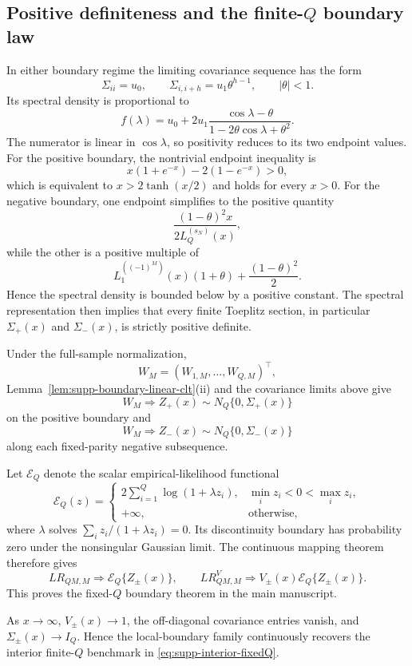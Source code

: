 \documentclass[12pt]{article}
\theoremstyle{remark}
\begin{document}
\subsection{Positive definiteness and the finite-$Q$ boundary law}
In either boundary regime the limiting covariance sequence has the form
\[
\Sigma_{ii}=u_0,
\qquad
\Sigma_{i,i+h}=u_1\theta^{h-1},
\qquad |\theta|<1.
\]
Its spectral density is proportional to
\[
f(\lambda)=u_0+2u_1\frac{\cos\lambda-\theta}{1-2\theta\cos\lambda+\theta^2}.
\]
The numerator is linear in $\cos\lambda$, so positivity reduces to its two endpoint values. For the positive boundary, the nontrivial endpoint inequality is
\[
x(1+e^{-x})-2(1-e^{-x})>0,
\]
which is equivalent to $x>2\tanh(x/2)$ and holds for every $x>0$. For the negative boundary, one endpoint simplifies to the positive quantity
\[
\frac{(1-\theta)^2x}{2L_Q^{(s_N)}(x)},
\]
while the other is a positive multiple of
\[
L_1^{((-1)^M)}(x)(1+\theta)+\frac{(1-\theta)^2}{2}.
\]
Hence the spectral density is bounded below by a positive constant. The spectral representation then implies that every finite Toeplitz section, in particular $\Sigma_+(x)$ and $\Sigma_-(x)$, is strictly positive definite.

Under the full-sample normalization,
\[
W_M=(W_{1,M},\ldots,W_{Q,M})^\top,
\]
Lemma~\ref{lem:supp-boundary-linear-clt}(ii) and the covariance limits above give
\[
W_M\Rightarrow Z_+(x)\sim N_Q\{0,\Sigma_+(x)\}
\]
on the positive boundary and
\[
W_M\Rightarrow Z_-(x)\sim N_Q\{0,\Sigma_-(x)\}
\]
along each fixed-parity negative subsequence.

Let $\mathcal E_Q$ denote the scalar empirical-likelihood functional
\[
\mathcal E_Q(z)=
\begin{cases}
2\sum_{i=1}^Q\log(1+\lambda z_i),&\min_i z_i<0<\max_i z_i,\\
+\infty,&\text{otherwise},
\end{cases}
\]
where $\lambda$ solves $\sum_i z_i/(1+\lambda z_i)=0$. Its discontinuity boundary has probability zero under the nonsingular Gaussian limit. The continuous mapping theorem therefore gives
\begin{equation}
LR_{QM,M}\Rightarrow\mathcal E_Q\{Z_\pm(x)\},
\qquad
LR^V_{QM,M}\Rightarrow V_\pm(x)\mathcal E_Q\{Z_\pm(x)\}.
\label{eq:supp-fixedQ-laws}
\end{equation}
This proves the fixed-$Q$ boundary theorem in the main manuscript.

As $x\to\infty$, $V_\pm(x)\to1$, the off-diagonal covariance entries vanish, and $\Sigma_\pm(x)\to I_Q$. Hence the local-boundary family continuously recovers the interior finite-$Q$ benchmark in \eqref{eq:supp-interior-fixedQ}.
\end{document}

